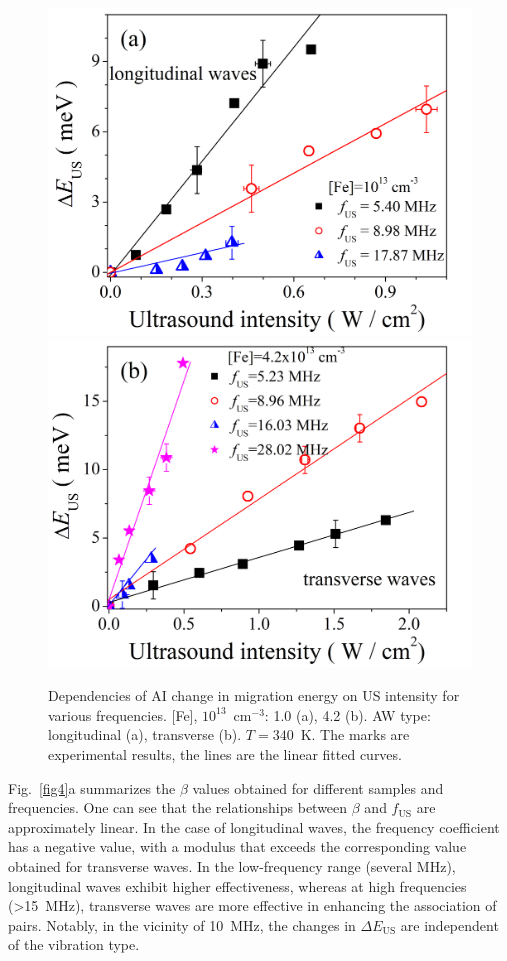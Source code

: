 \documentclass{ttp}
\begin{document}
\begin{figure}
	\centering
     \includegraphics[width=0.4\linewidth]{Fig3a.png}
     \includegraphics[width=0.4\linewidth]{Fig3b.png}
	  \caption{Dependencies of AI change in migration energy on US intensity
      for various frequencies.
       [Fe], $10^{13}$~cm$^{-3}$: 1.0 (a), 4.2 (b).
       AW type: longitudinal (a), transverse (b).
       $T=340$~K.
       The marks are experimental results,
       the lines are the linear fitted curves.
}\label{fig3}
\end{figure}

Fig.~\ref{fig4}a summarizes the $\beta$ values obtained for different samples and frequencies.
One can see that the relationships between $\beta$ and $f_\mathrm{US}$ are approximately linear.
In the case of longitudinal waves, the frequency coefficient has a negative value, 
with a modulus that exceeds the corresponding value obtained for transverse waves.
In the low-frequency range (several MHz), 
longitudinal waves exhibit higher effectiveness, 
whereas at high frequencies (>15~MHz),  transverse waves are more effective 
in enhancing the association of pairs. 
Notably, in the vicinity of 10~MHz, the changes in $\Delta E_\mathrm{US}$ are independent of the vibration type.
\end{document}
